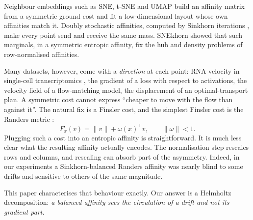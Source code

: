 \documentclass{article}
\theoremstyle{plain}
\theoremstyle{definition}
\theoremstyle{remark}
\newcommand{\1}{\mathbf{1}}
\begin{document}
Neighbour embeddings such as SNE, t-SNE and UMAP
\citep{hinton2002sne,vandermaaten2008tsne,mcinnes2018umap} build an affinity
matrix from a symmetric ground cost and fit a low-dimensional layout whose
own affinities match it. Doubly stochastic affinities, computed by
Sinkhorn iterations \citep{sinkhorn1967concerning,cuturi2013sinkhorn},
make every point send and receive the same mass. SNEkhorn
\citep{vanassel2023snekhorn} showed that such marginals, in a symmetric
entropic affinity, fix the hub and density problems of row-normalised
affinities.

Many datasets, however, come with a \emph{direction} at each point: RNA
velocity in single-cell transcriptomics
\citep{lamanno2018rna,bergen2020generalizing}, the gradient of a loss with
respect to activations, the velocity field of a flow-matching model, the
displacement of an optimal-transport plan. A symmetric cost cannot express
``cheaper to move with the flow than against it''. The natural fix is a
Finsler cost, and the simplest Finsler cost is the Randers metric
\citep{randers1941asymmetrical,bao2000introduction}:
\begin{equation}
  F_x(v) = \|v\| + \omega(x)^\top v, \qquad \|\omega\| < 1 .
  \label{eq:randers}
\end{equation}
Plugging such a cost into an entropic affinity is straightforward. It is
much less clear what the resulting affinity actually encodes. The
normalisation step rescales rows and columns, and rescaling can absorb part
of the asymmetry. Indeed, in our experiments a Sinkhorn-balanced Randers
affinity was nearly blind to some drifts and sensitive to others of the same
magnitude.

This paper characterises that behaviour exactly. Our answer is a Helmholtz
decomposition: \emph{a balanced affinity sees the circulation of a drift and
not its gradient part.}
\end{document}
